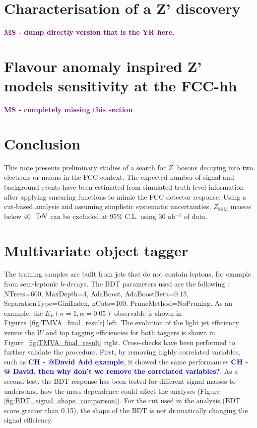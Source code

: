 \documentclass[a4paper,11pt]{article}
\newcommand{\CH}[1] {\textbf{\textcolor{blue}{CH - #1}}}
\newcommand{\MS}[1] {\textbf{\textcolor{purple}{MS - #1}}}
\newcommand{\Zp}{\ensuremath{Z^{\prime}}}
\newcommand{\ZpSSM}{\ensuremath{Z^{\prime}_{\mathrm{SSM}}}}
\def\afb{\mbox{ab$^{-1}$}}%
\def\TeV{\ifmmode {\mathrm{\ Te\kern -0.1em V}}\else
                   \textrm{Te\kern -0.1em V}\fi}%
\begin{document}
\section{Characterisation of a Z' discovery}
\label{sec:zprimedisc}

\MS{dump directly version that is the YR here.}

\section{Flavour anomaly inspired Z' models sensitivity at the FCC-hh}
\label{sec:zprimeflav}

\MS{completely missing this section}

\section{Conclusion}
\label{sec:conc}

This note presents preliminary studies of a search for $\Zp$
bosons decaying into two electrons or muons in the FCC context. The expected number
of signal and background events have been estimated from simulated truth level information
after applying smearing functions to mimic the FCC detector response.
Using a cut-based analysis and assuming simplistic systematic uncertainties, $\ZpSSM$
masses below 40 $\TeV$ can be excluded at 95$\%$ C.L.
using 30 $\afb{}$ of data.

\appendix
\section{Multivariate object tagger}
\label{sec:app:mva}
The training samples are built from jets that do not contain leptons, for example from sem-leptonic b-decays.
The BDT parameters used are the following : NTrees=600, MaxDepth=4, AdaBoost, AdaBoostBeta=0.15, SeparationType=GiniIndex, nCuts=100, PruneMethod=NoPruning.
As an example, the $E_{F}(n=1,\alpha=0.05)$ observable is shown in Figures~\ref{fig:TMVA_final_result} left.
The evolution of the light jet efficiency versus the $W$ and top tagging efficiencies for both taggers is shown in Figure~\ref{fig:TMVA_final_result} right.
Cross-checks have been performed to further validate the procedure. First, by removing highly correlated variables, such as \CH{@David Add example}, it showed the same performances \CH{@ David, then why don't we remove the correlated variables?}.
As a second test, the BDT response has been tested for different signal masses to understand how the mass dependence could affect the analyses (Figure \ref{fig:BDT_signal_shape_comparison}). For the cut used in the analysis (BDT score greater than 0.15), the shape of the BDT is not dramatically changing the signal efficiency.%
\end{document}
